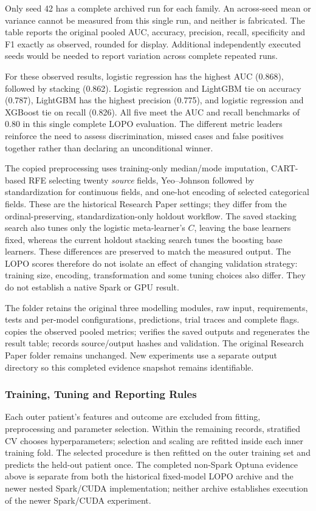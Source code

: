 Only seed 42 has a complete archived run for each family. An across-seed mean or variance cannot be measured from this single run, and neither is fabricated. The table reports the original pooled AUC, accuracy, precision, recall, specificity and F1 exactly as observed, rounded for display. Additional independently executed seeds would be needed to report variation across complete repeated runs.

For these observed results, logistic regression has the highest AUC (0.868), followed by stacking (0.862). Logistic regression and LightGBM tie on accuracy (0.787), LightGBM has the highest precision (0.775), and logistic regression and XGBoost tie on recall (0.826). All five meet the AUC and recall benchmarks of 0.80 in this single complete LOPO evaluation. The different metric leaders reinforce the need to assess discrimination, missed cases and false positives together rather than declaring an unconditional winner.

The copied preprocessing uses training-only median/mode imputation, CART-based RFE selecting twenty \emph{source} fields, Yeo--Johnson followed by standardization for continuous fields, and one-hot encoding of selected categorical fields. These are the historical Research Paper settings; they differ from the ordinal-preserving, standardization-only holdout workflow. The saved stacking search also tunes only the logistic meta-learner's $C$, leaving the base learners fixed, whereas the current holdout stacking search tunes the boosting base learners. These differences are preserved to match the measured output. The LOPO scores therefore do not isolate an effect of changing validation strategy: training size, encoding, transformation and some tuning choices also differ. They do not establish a native Spark or GPU result.

The  folder retains the original three modelling modules, raw input, requirements, tests and per-model configurations, predictions, trial traces and complete flags.  copies the observed pooled metrics;  verifies the saved outputs and regenerates the result table;  records source/output hashes and validation. The original Research Paper folder remains unchanged. New experiments use a separate output directory so this completed evidence snapshot remains identifiable.

\subsubsection{Training, Tuning and Reporting Rules}
Each outer patient's features and outcome are excluded from fitting, preprocessing and parameter selection. Within the remaining records, stratified CV chooses hyperparameters; selection and scaling are refitted inside each inner training fold. The selected procedure is then refitted on the outer training set and predicts the held-out patient once. The completed non-Spark Optuna evidence above is separate from both the historical fixed-model LOPO archive and the newer nested Spark/CUDA implementation; neither archive establishes execution of the newer Spark/CUDA experiment.

